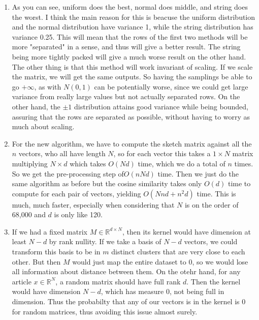 \documentclass[12pt]{article}
\theoremstyle{definitionstyle}
\def\mbb#1{\mathbb{#1}}
\def \R{\mbb{R}}
\begin{document}
\begin{enumerate}[leftmargin=\labelsep]
\begin{enumerate}
            \item 
            As you can see, uniform does the best, normal does middle, and string does the worst. I think the main reason for this is beacuse the uniform distribution and the normal distribution have variance 1, while the string distribution has variance 0.25. This will mean that the rows of the first two methods will be more "separated" in a sense, and thus will give a better result. The string being more tightly packed will give a much worse result on the other hand. The other thing is that this method will work invariant of scaling. If we scale the matrix, we will get the same outputs. So having the samplings be able to go $+\infty$, as with $N(0,1)$ can be potentially worse, since we could get large variance from really large values but not actually separated rows. On the other hand, the $\pm 1$ distribution attains good variance while being bounded, assuring that the rows are separated as possible, without having to worry as much about scaling. 

            \item For the new algorithm, we have to compute the sketch matrix against all the $n$ vectors, who all have length $N$, so for each vector this takes a $1 \times N$ matrix multiplying $N \times d$ which takes $O(Nd)$ time, which we do a total of $n$ times. So we get the pre-processing step of$ O(nNd)$ time. Then we just do the same algorithm as before but the cosine similarity takes only $O(d)$ time to compute for each pair of vectors, yielding $O(Nnd + n^2d)$ time. This is much, much faster, especially when considering that $N$ is on the order of 68,000 and $d$ is only like 120.

            \item If we had a fixed matrix $M \in \R^{d \times N}$, then its kernel would have dimension at least $N-d$ by rank nullity. If we take a basis of $N-d$ vectors, we could transform this basis to be in $m$ distinct clusters that are very close to each other. But then $M$ would just map the entire dataset to 0, so we would lose all information about distance between them. On the otehr hand, for any article $x \in \R^N$, a random matrix should have full rank $d$. Then the kernel would have dimension $N-d$, which has measure 0, not being full in dimension. Thus the probabilty that any of our vectors is in the kernel is 0 for random matrices, thus avoiding this issue almost surely.
        \end{enumerate}
    \end{enumerate}
\end{document}

